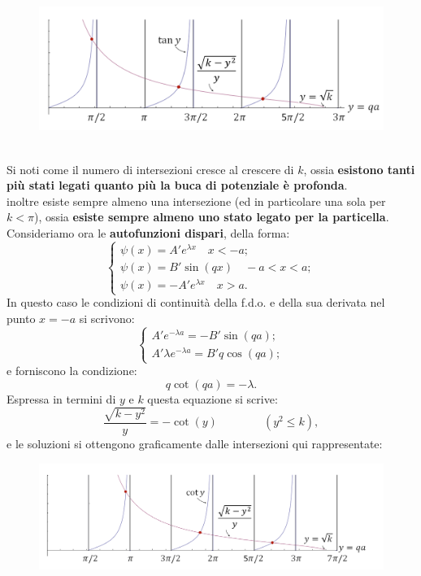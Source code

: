 \documentclass[a4paper,11pt,oneside]{book}
\begin{document}
\begin{figure}[!htbp]
\includegraphics[width=\textwidth]{immagini/cap_10/fig_10_3.png}
\end{figure}
\\
Si noti come il numero di intersezioni cresce al crescere di $k$, ossia \textbf{esistono tanti più stati legati quanto più la buca di potenziale è profonda}.\\
inoltre esiste sempre almeno una intersezione (ed in particolare una sola per $k<\pi$), ossia \textbf{esiste sempre almeno uno stato legato per la particella}.\\
Consideriamo ora le \textbf{autofunzioni dispari}, della forma:
\begin{equation}
\begin{cases}
\psi (x) = A'e^{\lambda x} \quad x<-a;\\
\psi (x) = B'\sin(qx) \quad -a<x<a;\\
\psi (x) = -A'e^{\lambda x} \quad x>a.\end{cases} 
\end{equation}
In questo caso le condizioni di continuità della f.d.o. e della sua derivata nel punto $x=-a$ si scrivono:
\begin{equation}
\begin{cases}
A'e^{-\lambda a} =-B'\sin(qa) ;\\
A' \lambda e^{-\lambda a} = B'q \cos (qa);\end{cases} 
\end{equation}
e forniscono la condizione:
\begin{equation}
q \cot (qa) =- \lambda.
\label{eq:cap10_2}
\end{equation}
Espressa in termini di $y$ e $k$ questa equazione si scrive:
\begin{equation}
\frac{\sqrt{k-y^2}}{y}= -\cot (y) \qquad \qquad (y^2 \leq k),
\end{equation}
e le soluzioni si ottengono graficamente dalle intersezioni qui rappresentate:
\newpage
\begin{figure}[!htbp]
\includegraphics[width=\textwidth]{immagini/cap_10/fig_10_4.png}
\end{figure}
\end{document}
